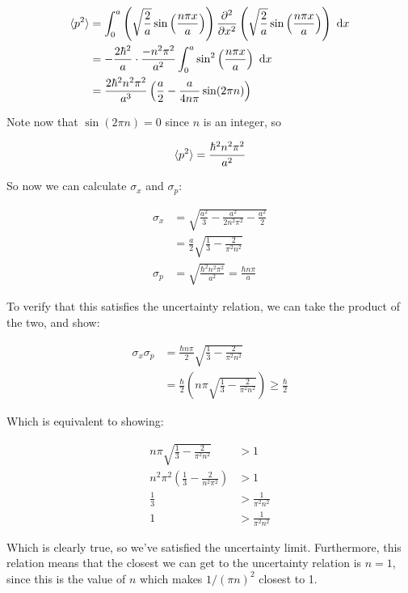 \documentclass{article}
\begin{document}
\begin{solution}
        \begin{align*}
            \langle p^2 \rangle &= \int_0^a \left(\sqrt{\frac{2}{a}}\sin\left(\frac{n \pi x}{a}\right)\right) \frac{\partial^2}{\partial x^2} \left(\sqrt{\frac{2}{a}} \sin \left(\frac{n \pi x}{a}\right)\right)\ \mathrm d x \\
            &= -\frac{2\hbar^2}{a} \cdot \frac{-n^2\pi^2}{a^2} \int_0^a  \sin^2\left(\frac{n \pi x}{a}\right) \ \mathrm d x\\
            &= \frac{2\hbar^2n^2 \pi^2}{a^3} \left( \frac{a}{2} - \frac{a}{4n \pi} \sin (2 \pi n)\right)
        \end{align*}

        Note now that $\sin (2\pi n) = 0$ since $n$ is an integer, so

        \[ \langle p^2 \rangle = \frac{\hbar^2n^2\pi^2}{a^2}\]

        So now we can calculate $\sigma_x$ and $\sigma_p$:

        \begin{align*}
            \sigma_x &= \sqrt{\frac{a^2}{3} - \frac{a^2}{2n^2\pi^2} - \frac{a^2}{2}}\\
            &= \frac{a}{2} \sqrt{\frac{1}{3} - \frac{2}{\pi^2 n^2}}\\
            \sigma_p &= \sqrt{\frac{\hbar^2 n^2 \pi^2}{a^2}} = \frac{\hbar n \pi}{a}
        \end{align*}

        To verify that this satisfies the uncertainty relation, we can take the product of the two, and show:

        \begin{align*}
            \sigma_x\sigma_p &= \frac{\hbar n \pi}{2} \sqrt{\frac{1}{3} - \frac{2}{\pi^2n^2}}\\
            &= \frac{\hbar}{2} \left( n\pi \sqrt{\frac{1}{3} - \frac{2}{\pi^2n^2}}\right) \ge \frac{\hbar}{2}
        \end{align*}

        Which is equivalent to showing:

        \begin{align*}
            n\pi \sqrt{\frac{1}{3} - \frac{2}{\pi^2n^2}} &> 1\\
            n^2\pi^2 \left(\frac{1}{3} - \frac{2}{n^2\pi^2} \right)&> 1\\
            \frac{1}{3} & > \frac{1}{\pi^2n^2}\\
            1 &> \frac{1}{\pi^2n^2}
        \end{align*}

        Which is clearly true, so we've satisfied the uncertainty limit. Furthermore, this relation means that the closest we can get to the uncertainty relation is $n = 1$, since this is the value of $n$ which makes $1/(\pi n)^2$ closest to 1.

    \end{solution}
\end{document}
